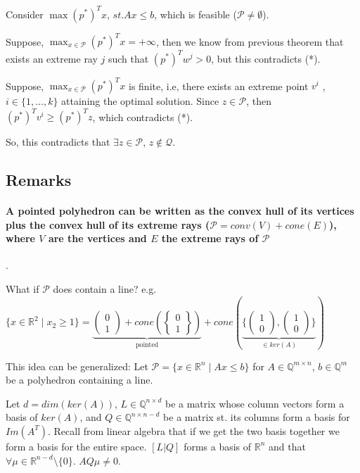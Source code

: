\documentclass[main]{subfiles}
\begin{document}
Consider $\displaystyle \max (p^*)^T x$, $st. Ax \leq b$, which is feasible ($
\mathcal{P} \neq \emptyset$).

Suppose, $\displaystyle \max_{x \in \mathcal{P}} (p^*)^T x = +\infty$, then we 
know from previous theorem that exists an extreme ray $j$ such that $(p^*)^T 
w^j > 0$, but this contradicts (*).

Suppose, $\displaystyle \max_{x \in \mathcal{P}} (p^*)^T x$ is finite, i.e,
there exists an extreme point $v^i$ , $i \in \{1, \dots, k\}$ attaining the
optimal solution. Since $z \in \mathcal{P}$, then $(p^*)^T v^i \geq (p^*)^T z$,
which contradicts (*).

So, this contradicts that $\exists z \in \mathcal{P}$, $z \notin \mathcal{Q}$.

\subsection{Remarks}

\paragraph{A pointed polyhedron can be written as the convex hull of its
vertices plus the convex hull of its extreme rays ($\mathcal{P} = conv(V) +
cone(E)$), where $V$ are the vertices and $E$ the extreme rays of $\mathcal{P}
$}.

What if $\mathcal{P}$ does contain a line? e.g. $\{x \in \mathbb{R}^2 \mid x_2
\geq 1 \} =
\underbrace{\begin{pmatrix} 0 \\ 1 \end{pmatrix} + cone (\begin{Bmatrix} 0 \\ 1
\end{Bmatrix})}_{\text{pointed}} + cone(\underbrace{\{ \begin{pmatrix} 1 \\ 0
\end{pmatrix}, \begin{pmatrix} 1 \\ 0 \end{pmatrix} \}}_{\in ker(A)})$

This idea can be generalized: Let $\mathcal{P} = \{x \in \mathbb{R}^n \mid Ax
\leq b \}$ for $A \in \mathbb{Q}^{m \times n}$, $b \in \mathbb{Q}^m$ be a
polyhedron containing a line.

Let $d = dim(ker(A))$, $L \in \mathbb{Q}^{n \times d}$ be a matrix whose column
vectors form a basis of $ker(A)$, and $Q \in \mathbb{Q}^{n \times n-d}$ be a
matrix st. its columns form a basis for $Im(A^T)$. Recall from linear algebra
that if we get the two basis together we form a basis for the entire space.
$[L | Q]$ forms a basis of $\mathbb{R}^n$ and that $\forall \mu \in \mathbb{R}
^{n-d}\setminus \{0\}$. $AQ\mu \neq 0$.\\
\end{document}
